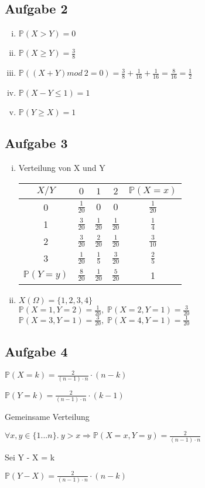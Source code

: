 \documentclass[10pt,a4paper,parskip=half]{scrartcl}
\begin{document}
\subsection*{Aufgabe 2}
\begin{enumerate}[(i)]
\item
$\mathbb{P}(X > Y) = 0$
\item
$\mathbb{P}(X \geq Y) = \frac{3}{8}$
\item
$\mathbb{P}((X + Y ) mod \: 2 = 0) = \frac{3}{8} + \frac{1}{16} + \frac{1}{16} = \frac{8}{16} = \frac{1}{2}$
\item
$\mathbb{P}(X - Y \leq 1) = 1$
\item
$\mathbb{P}(Y \geq X) = 1$
\end{enumerate}

\subsection*{Aufgabe 3}
\begin{enumerate}[(i)]
\item
Verteilung von X und Y
\begin{tabular}{c | c c c | c}
$X/Y$ & $0$ & $1$ & $2$ & $\mathbb{P}(X=x) $\\ \hline
0 & $\frac{1}{20}$ & $0$ & $0$ & $\frac{1}{20}$ \\
1 & $\frac{3}{20}$ & $\frac{1}{20}$ & $\frac{1}{20}$ & $\frac{1}{4}$ \\
2 & $\frac{3}{20}$ & $\frac{2}{20}$ & $\frac{1}{20}$ & $\frac{3}{10}$ \\
3 & $\frac{1}{20}$ & $\frac{1}{5}$ & $\frac{3}{20}$ & $\frac{2}{5}$ \\ \hline
$\mathbb{P}(Y=y)$ & $\frac{8}{20}$ & $\frac{1}{20}$ & $\frac{5}{20}$ & 1
\end{tabular}
\item
$X(\Omega) = \{1,2,3,4\}$ \\
$\mathbb{P}(X=1, Y=2) = \frac{1}{20}, \; \mathbb{P}(X=2, Y=1) = \frac{3}{20}$ \\
$\mathbb{P}(X=3, Y=1) = \frac{3}{20}, \; \mathbb{P}(X=4, Y=1) = \frac{1}{20}$
\end{enumerate}

\subsection*{Aufgabe 4}
\begin{center}
$\mathbb{P}(X=k) = \frac{2}{(n-1)\cdot n} \cdot (n-k)$ \\
\end{center}
\begin{center}
$\mathbb{P}(Y=k) = \frac{2}{(n-1)\cdot n} \cdot (k-1)$ \\
\end{center}
Gemeinsame Verteilung
\begin{center}
$\forall x,y \in \{1...n\} . ~y > x \Rightarrow \mathbb{P}(X=x, Y=y) = \frac{2}{(n-1)\cdot n}$
\end{center}
Sei Y - X = k \\
\begin{center}
$\mathbb{P}(Y-X) = \frac{2}{(n-1)\cdot n} \cdot (n-k)$ \\
\end{center}
\end{document}
